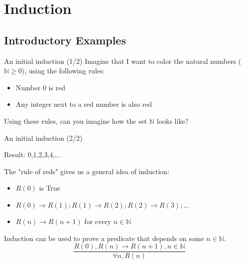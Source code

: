 \section{Induction}


\subsection{Introductory Examples}



\begin{frame}{An initial induction (1/2)}
  Imagine that I want to color the natural numbers ($\mathbb{N} \geq 0$), using the following rules:\bigskip

  \begin{itemize}
    \item Number $0$ is \alert{red}
    \item Any integer next to a \alert{red} number is also \alert{red}
  \end{itemize}\bigskip

  Using these rules, can you imagine how the set $\mathbb{N}$ looks like?
\end{frame}

\begin{frame}{An initial induction (2/2)}

  \begin{center}
    Result: \alert{0,1,2,3,4,...}
  \end{center}\bigskip

  The "rule of reds" gives us a general idea of induction:

  \begin{itemize}
  \item $R(0)$ is True
  \item $R(0) \rightarrow R(1); R(1) \rightarrow R(2); R(2) \rightarrow R(3); \ldots$
  \item $R(n) \rightarrow R(n+1)$ for every $n \in \mathbb{N}$
  \end{itemize}\bigskip

  Induction can be used to prove a predicate that depends on some $n \in \mathbb{N}$.
  \begin{equation*}
    \frac{R(0), R(n)\rightarrow R(n+1), n\in\mathbb{N}}{\forall n, R(n)}
  \end{equation*}
\end{frame}

